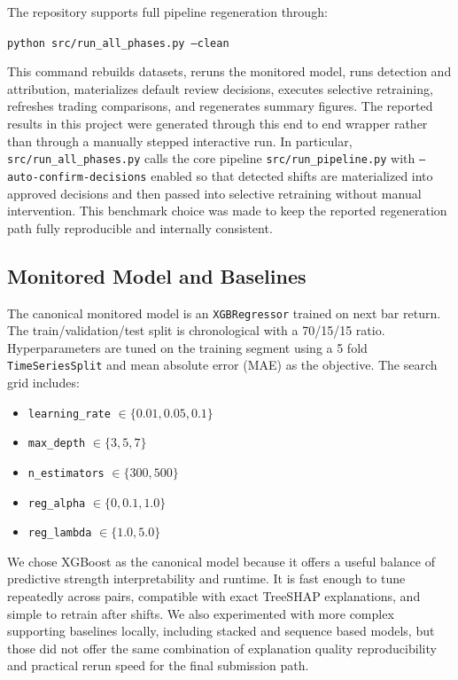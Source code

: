 \documentclass[11pt]{article}
\begin{document}
The repository supports full pipeline regeneration through:
\begin{center}
\texttt{python src/run\_all\_phases.py --clean}
\end{center}
This command rebuilds datasets, reruns the monitored model, runs detection and attribution, materializes default review decisions, executes selective retraining, refreshes trading comparisons, and regenerates summary figures. The reported results in this project were generated through this end to end wrapper rather than through a manually stepped interactive run. In particular, \texttt{src/run\_all\_phases.py} calls the core pipeline \texttt{src/run\_pipeline.py} with \texttt{--auto-confirm-decisions} enabled so that detected shifts are materialized into approved decisions and then passed into selective retraining without manual intervention. This benchmark choice was made to keep the reported regeneration path fully reproducible and internally consistent.

\subsection{Monitored Model and Baselines}
The canonical monitored model is an \texttt{XGBRegressor} trained on next bar return. The train/validation/test split is chronological with a 70/15/15 ratio. Hyperparameters are tuned on the training segment using a 5 fold \texttt{TimeSeriesSplit} and mean absolute error (MAE) as the objective. The search grid includes:
\begin{itemize}
    \item \texttt{learning\_rate} $\in \{0.01, 0.05, 0.1\}$
    \item \texttt{max\_depth} $\in \{3,5,7\}$
    \item \texttt{n\_estimators} $\in \{300,500\}$
    \item \texttt{reg\_alpha} $\in \{0, 0.1, 1.0\}$
    \item \texttt{reg\_lambda} $\in \{1.0, 5.0\}$
\end{itemize}

We chose XGBoost as the canonical model because it offers a useful balance of predictive strength interpretability and runtime. It is fast enough to tune repeatedly across pairs, compatible with exact TreeSHAP explanations, and simple to retrain after shifts. We also experimented with more complex supporting baselines locally, including stacked and sequence based models, but those did not offer the same combination of explanation quality reproducibility and practical rerun speed for the final submission path.
\end{document}
